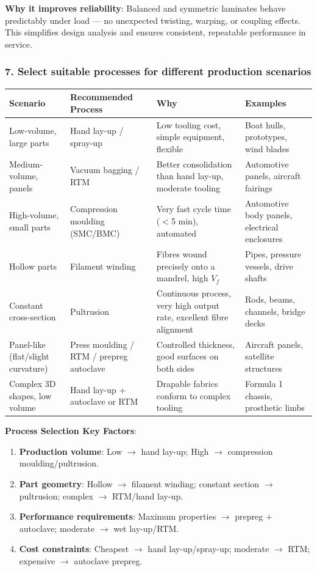 \documentclass{NoteThesis/note-thesis}
\begin{document}
\textbf{Why it improves reliability}: Balanced and symmetric laminates behave predictably under load — no unexpected twisting, warping, or coupling effects. This simplifies design analysis and ensures consistent, repeatable performance in service.

\subsubsection*{7. Select suitable processes for different production scenarios}

\begin{table}[h]
    \centering
    \begin{tabular}{p{2.5cm}p{3.5cm}p{4cm}p{4cm}}
        \hline
        \textbf{Scenario} & \textbf{Recommended Process} & \textbf{Why} & \textbf{Examples} \\
        \hline
        Low-volume, large parts & Hand lay-up / spray-up & Low tooling cost, simple equipment, flexible & Boat hulls, prototypes, wind blades \\
        Medium-volume, panels & Vacuum bagging / RTM & Better consolidation than hand lay-up, moderate tooling & Automotive panels, aircraft fairings \\
        High-volume, small parts & Compression moulding (SMC/BMC) & Very fast cycle time ($<$5 min), automated & Automotive body panels, electrical enclosures \\
        Hollow parts & Filament winding & Fibres wound precisely onto a mandrel, high $V_f$ & Pipes, pressure vessels, drive shafts \\
        Constant cross-section & Pultrusion & Continuous process, very high output rate, excellent fibre alignment & Rods, beams, channels, bridge decks \\
        Panel-like (flat/slight curvature) & Press moulding / RTM / prepreg autoclave & Controlled thickness, good surfaces on both sides & Aircraft panels, satellite structures \\
        Complex 3D shapes, low volume & Hand lay-up + autoclave or RTM & Drapable fabrics conform to complex tooling & Formula 1 chassis, prosthetic limbs \\
        \hline
    \end{tabular}
\end{table}

\textbf{Process Selection Key Factors}:
\begin{enumerate}
    \item \textbf{Production volume}: Low $\to$ hand lay-up; High $\to$ compression moulding/pultrusion.
    \item \textbf{Part geometry}: Hollow $\to$ filament winding; constant section $\to$ pultrusion; complex $\to$ RTM/hand lay-up.
    \item \textbf{Performance requirements}: Maximum properties $\to$ prepreg + autoclave; moderate $\to$ wet lay-up/RTM.
    \item \textbf{Cost constraints}: Cheapest $\to$ hand lay-up/spray-up; moderate $\to$ RTM; expensive $\to$ autoclave prepreg.
\end{enumerate}
\end{document}
